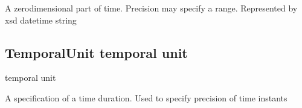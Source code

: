 \documentclass[letterpaper,10pt,english]{sphinxmanual}
\begin{document}
\begin{sphinxShadowBox}

\sphinxAtStartPar
{\hyperref[\detokenize{doc-BFO_0000148::doc}]{}}
\end{sphinxShadowBox}

\begin{sphinxShadowBox}

\sphinxAtStartPar
A zero\sphinxhyphen{}dimensional part of time.  Precision may specify a range.  Represented by xsd datetime string
\end{sphinxShadowBox}

\begin{sphinxShadowBox}

\sphinxAtStartPar
{}
\end{sphinxShadowBox}
\begin{quote}

\ignorespaces \end{quote}


\subsection{TemporalUnit \sphinxhyphen{} temporal unit}
\label{\detokenize{doc-TemporalUnit:temporalunit-temporal-unit}}\label{\detokenize{doc-TemporalUnit:index-0}}\label{\detokenize{doc-TemporalUnit::doc}}
\begin{sphinxShadowBox}

\sphinxAtStartPar
temporal unit
\end{sphinxShadowBox}

\begin{sphinxShadowBox}

\sphinxAtStartPar
{\hyperref[\detokenize{doc-BFO_0000038::doc}]{}}
\end{sphinxShadowBox}

\begin{sphinxShadowBox}

\sphinxAtStartPar
A specification of a time duration.  Used to specify precision of time instants
\end{sphinxShadowBox}
\end{document}
